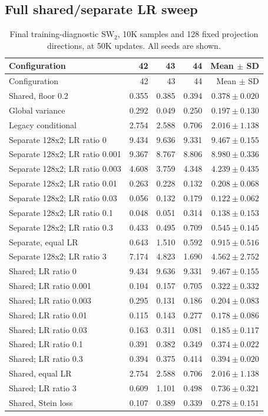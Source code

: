\documentclass[11pt,a4paper]{article}
\begin{document}
\subsection{Full shared/separate LR sweep}
{\small
\begin{longtable}{@{}>{\raggedright\arraybackslash}p{5cm}rrrr@{}}
\caption{Final training-diagnostic SW$_2$, 10K samples and 128 fixed projection directions, at 50K updates. All seeds are shown.}\\
\toprule
Configuration & 42 & 43 & 44 & Mean $\pm$ SD \\ \midrule
\endfirsthead
\toprule
Configuration & 42 & 43 & 44 & Mean $\pm$ SD \\ \midrule
\endhead
Shared, floor 0.2 & 0.355 & 0.385 & 0.394 & $0.378\pm0.020$ \\
Global variance & 0.292 & 0.049 & 0.250 & $0.197\pm0.130$ \\
Legacy conditional & 2.754 & 2.588 & 0.706 & $2.016\pm1.138$ \\
Separate 128x2; LR ratio 0 & 9.434 & 9.636 & 9.331 & $9.467\pm0.155$ \\
Separate 128x2; LR ratio 0.001 & 9.367 & 8.767 & 8.806 & $8.980\pm0.336$ \\
Separate 128x2; LR ratio 0.003 & 4.608 & 3.759 & 4.348 & $4.239\pm0.435$ \\
Separate 128x2; LR ratio 0.01 & 0.263 & 0.228 & 0.132 & $0.208\pm0.068$ \\
Separate 128x2; LR ratio 0.03 & 0.056 & 0.132 & 0.179 & $0.122\pm0.062$ \\
Separate 128x2; LR ratio 0.1 & 0.048 & 0.051 & 0.314 & $0.138\pm0.153$ \\
Separate 128x2; LR ratio 0.3 & 0.433 & 0.495 & 0.709 & $0.545\pm0.145$ \\
Separate, equal LR & 0.643 & 1.510 & 0.592 & $0.915\pm0.516$ \\
Separate 128x2; LR ratio 3 & 7.174 & 4.823 & 1.690 & $4.562\pm2.752$ \\
Shared; LR ratio 0 & 9.434 & 9.636 & 9.331 & $9.467\pm0.155$ \\
Shared; LR ratio 0.001 & 0.104 & 0.157 & 0.705 & $0.322\pm0.332$ \\
Shared; LR ratio 0.003 & 0.295 & 0.131 & 0.186 & $0.204\pm0.083$ \\
Shared; LR ratio 0.01 & 0.115 & 0.143 & 0.277 & $0.178\pm0.086$ \\
Shared; LR ratio 0.03 & 0.163 & 0.311 & 0.081 & $0.185\pm0.117$ \\
Shared; LR ratio 0.1 & 0.391 & 0.382 & 0.349 & $0.374\pm0.022$ \\
Shared; LR ratio 0.3 & 0.394 & 0.375 & 0.414 & $0.394\pm0.020$ \\
Shared, equal LR & 2.754 & 2.588 & 0.706 & $2.016\pm1.138$ \\
Shared; LR ratio 3 & 0.609 & 1.101 & 0.498 & $0.736\pm0.321$ \\
Shared, Stein loss & 0.107 & 0.389 & 0.339 & $0.278\pm0.151$ \\
\bottomrule\end{longtable}}
\end{document}
